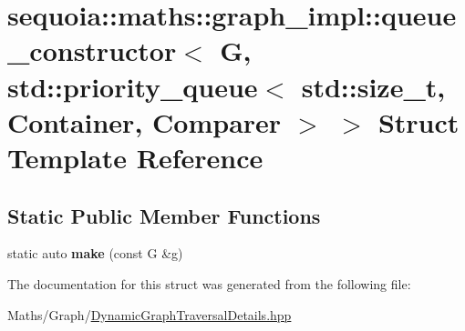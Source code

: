 \hypertarget{structsequoia_1_1maths_1_1graph__impl_1_1queue__constructor_3_01_g_00_01std_1_1priority__queue_3b14cc34c6db525a4ccfa283642d5a699}{}\section{sequoia\+::maths\+::graph\+\_\+impl\+::queue\+\_\+constructor$<$ G, std\+::priority\+\_\+queue$<$ std\+::size\+\_\+t, Container, Comparer $>$ $>$ Struct Template Reference}
\label{structsequoia_1_1maths_1_1graph__impl_1_1queue__constructor_3_01_g_00_01std_1_1priority__queue_3b14cc34c6db525a4ccfa283642d5a699}
\subsection*{Static Public Member Functions}
\begin{DoxyCompactItemize}
\item 
\mbox{\label{structsequoia_1_1maths_1_1graph__impl_1_1queue__constructor_3_01_g_00_01std_1_1priority__queue_3b14cc34c6db525a4ccfa283642d5a699_a526c50ea30a44a0106338e2aa85f8547}} 
static auto {\bfseries make} (const G \&g)
\end{DoxyCompactItemize}


The documentation for this struct was generated from the following file\+:\begin{DoxyCompactItemize}
\item 
Maths/\+Graph/\mbox{\hyperlink{_dynamic_graph_traversal_details_8hpp}{Dynamic\+Graph\+Traversal\+Details.\+hpp}}\end{DoxyCompactItemize}

